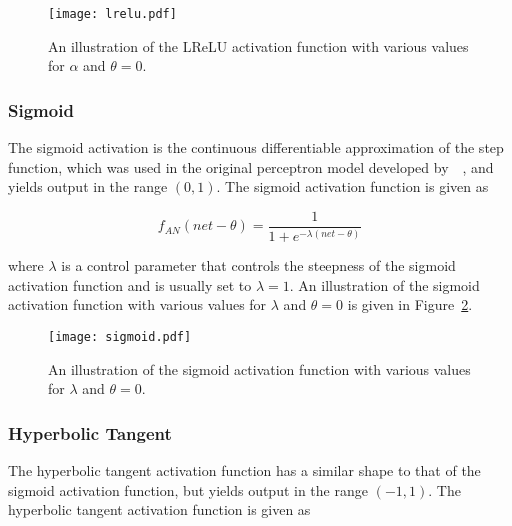 \begin{figure}[htb]
      \centering
      \texttt{[image: lrelu.pdf]}
      \caption[The \acs{LReLU} activation function]{An illustration of the \acs{LReLU} activation function with various values for $\alpha$ and $\theta = 0$.}
      \label{fig:anns:activation_functions:leaky_relu}
\end{figure}

\subsubsection{Sigmoid}\label{sec:anns:an:act_functions:sigmoid}

The sigmoid activation is the continuous differentiable approximation of the step function, which was used in the original perceptron model developed by~\citeauthor{ref:rosenblatt:1957}~\cite{ref:rosenblatt:1957}, and yields output in the range $(0, 1)$. The sigmoid activation function is given as

\begin{equation}
      f_{AN}(net - \theta) = \frac{1}{1+e^{-\lambda(net - \theta)}}
      \label{eq:sigmoid}
\end{equation}

where $\lambda$ is a control parameter that controls the steepness of the sigmoid activation function and is usually set to $\lambda = 1$. An illustration of the sigmoid activation function with various values for $\lambda$ and $\theta = 0$ is given in Figure~\ref{fig:anns:activation_functions:sigmoid}.

\begin{figure}[htb]
      \centering
      \texttt{[image: sigmoid.pdf]}
      \caption[The sigmoid activation function]{An illustration of the sigmoid activation function with various values for $\lambda$ and $\theta = 0$.}
      \label{fig:anns:activation_functions:sigmoid}
\end{figure}

\subsubsection{Hyperbolic Tangent}\label{sec:anns:an:act_functions:tanh}

The hyperbolic tangent activation function has a similar shape to that of the sigmoid activation function, but yields output in the range $(-1, 1)$. The hyperbolic tangent activation function is given as

